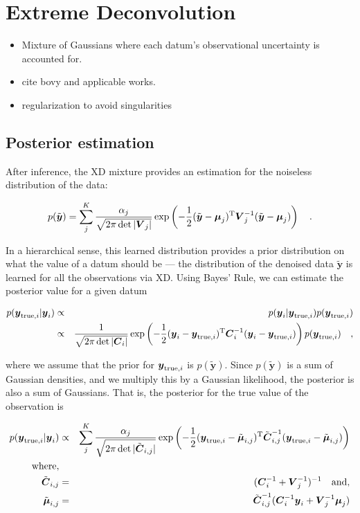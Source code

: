 \documentclass[12pt,preprint]{aastex}
\newcommand{\datavector}[1]{\boldsymbol{#1}}
\newcommand{\data}{\datavector{y}}
\newcommand{\datum}{\data_i}
\newcommand{\truedatum}{\data_{{\rm true}, i}}
\newcommand{\noiselessdata}{\tilde{\data}}
\newcommand{\xdcov}{\datavector{V}_j}
\newcommand{\datacov}{\datavector{C}}
\newcommand{\postcov}{\tilde{\datacov}_{i, j}}
\newcommand{\vmu}{\datavector{\mu}}
\newcommand{\postmu}{\tilde{\vmu}_{i, j}}
\newcommand{\datumcov}{\datacov_i}
\newcommand{\transpose}{{\rm T}}
\begin{document}
\section{Extreme Deconvolution}

\begin{itemize}
\item Mixture of Gaussians where each datum's observational uncertainty is accounted for.
\item cite bovy and applicable works.
\item regularization to avoid singularities
\end{itemize}

\subsection{Posterior estimation}

After inference, the XD mixture provides an estimation for the noiseless distribution of 
the data:

\begin{eqnarray}\displaystyle
p(\noiselessdata) = \sum_j^K \frac{\alpha_j}{\sqrt{2\pi\det{|\xdcov|}}} \exp \left (-\frac{1}{2}(\noiselessdata - \vmu_j)^\transpose \xdcov^{-1}(\noiselessdata - \vmu_j) \right )
\quad .
\label{eqn:noiseless}
\end{eqnarray}

In a hierarchical sense, this learned distribution provides a prior distribution on what the 
value of a datum should be --- the distribution of the denoised data $\noiselessdata$ is 
learned for all the observations via XD.  Using Bayes' Rule, we can estimate the posterior 
value for a given datum

\begin{eqnarray}\displaystyle
p(\truedatum | \datum) & \propto & p(\datum | \truedatum) p(\truedatum) \\
                                         & \propto & \frac{1}{\sqrt{2\pi\det{|\datumcov|}}} \exp \left (-\frac{1}{2}(\datum - \truedatum)^\transpose \datumcov^{-1}(\datum - \truedatum) \right ) p(\truedatum)
\quad ,
\label{eqn:posterior}
\end{eqnarray}

\noindent where we assume that the prior for $\truedatum$ is $p(\noiselessdata)$.  Since 
$p(\noiselessdata)$ is a sum of Gaussian densities, and we multiply this by a Gaussian 
likelihood, the posterior is also a sum of Gaussians.  That is, the posterior for the true 
value of the observation is

\begin{eqnarray}\displaystyle
p(\truedatum | \datum) & \propto & \sum_j^K \frac{\alpha_j}{\sqrt{2\pi\det{|\postcov|}}} \exp \left (-\frac{1}{2}(\truedatum - \postmu)^\transpose \postcov^{-1}(\truedatum - \postmu) \right ) \\
{\rm where,}\\
\postcov & = & (\datumcov^{-1} + \xdcov^{-1})^{-1} \quad {\rm and,} \\
\postmu & = &  \postcov^{-1} (\datumcov^{-1} \datum + \xdcov^{-1} \vmu_j)
\label{eqn:posterior}
\end{eqnarray}
\end{document}
